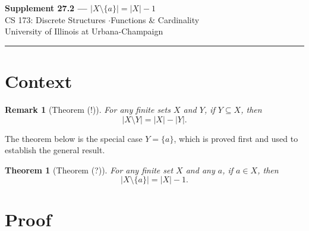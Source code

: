 \documentclass[11pt]{article}
\theoremstyle{defstyle}
\theoremstyle{thmstyle}
\newtheorem{theorem}{Theorem}[section]
\theoremstyle{notstyle}
\newtheorem*{remark}{Remark}
\begin{document}
\begin{center}
  {\Large\bfseries Supplement 27.2 --- $|X \setminus \{a\}| = |X| - 1$}\\[4pt]
  {\normalsize CS 173: Discrete Structures \quad$\cdot$\quad Functions \& Cardinality}\\[2pt]
  {\small\color{gray} University of Illinois at Urbana-Champaign}
\end{center}
\vspace{1em}\hrule\vspace{1.5em}

\section{Context}

\begin{notebox}
\begin{remark}[Theorem (!)]
For any finite sets $X$ and $Y$, if $Y \subseteq X$, then
\[
  |X \setminus Y| = |X| - |Y|.
\]
\end{remark}
\end{notebox}

The theorem below is the special case $Y = \{a\}$, which is proved first and used
to establish the general result.

\begin{thmbox}
\begin{theorem}[Theorem (?)]
For any finite set $X$ and any $a$, if $a \in X$, then
\[
  |X \setminus \{a\}| = |X| - 1.
\]
\end{theorem}
\end{thmbox}

\section{Proof}
\end{document}
